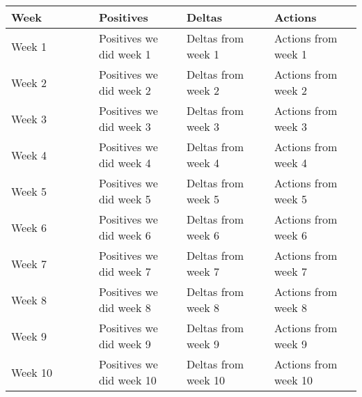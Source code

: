 \documentclass[onecolumn, draftclsnofoot,10pt, compsoc]{IEEEtran}
\begin{document}
\begin{tabular}{|p{0.25\linewidth}|p{0.25\linewidth}|p{0.25\linewidth}|p{0.25\linewidth}|}
\hline
\centering  Week &
\centering  Positives &
\centering Deltas &
\centering Actions \tabularnewline
\hline

Week 1 &
Positives we did week 1 &
Deltas from week 1 &
Actions from week 1
\tabularnewline
Week 2 &
Positives we did week 2 &
Deltas from week 2 &
Actions from week 2
\tabularnewline
Week 3 &
Positives we did week 3 &
Deltas from week 3 &
Actions from week 3
\tabularnewline
Week 4 &
Positives we did week 4 &
Deltas from week 4 &
Actions from week 4
\tabularnewline
Week 5 &
Positives we did week 5 &
Deltas from week 5 &
Actions from week 5
\tabularnewline
Week 6 &
Positives we did week 6 &
Deltas from week 6 &
Actions from week 6
\tabularnewline
Week 7 &
Positives we did week 7 &
Deltas from week 7 &
Actions from week 7
\tabularnewline
Week 8 &
Positives we did week 8 &
Deltas from week 8 &
Actions from week 8
\tabularnewline
Week 9 &
Positives we did week 9 &
Deltas from week 9 &
Actions from week 9
\tabularnewline
Week 10 &
Positives we did week 10 &
Deltas from week 10 &
Actions from week 10
\tabularnewline
\hline
\end{tabular}

\pagebreak


% 
% 
\end{document}
